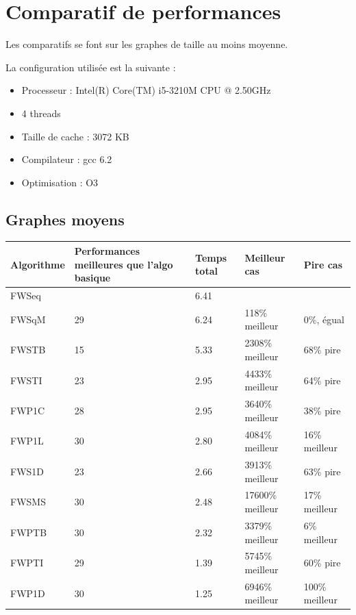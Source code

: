 \documentclass[a4paper,11pt]{article}
\begin{document}
\section{Comparatif de performances}

Les comparatifs se font sur les graphes de taille au moins moyenne.

La configuration utilisée est la suivante :

\begin{itemize}
  \item Processeur : Intel(R) Core(TM) i5-3210M CPU @ 2.50GHz
  \item 4 threads
  \item Taille de cache : 3072 KB
  \item Compilateur : gcc 6.2
  \item Optimisation : O3
\end{itemize}

\subsection{Graphes moyens}

\begin{center}
  \begin{tabular}{p{2cm} | p{4.5cm} | p{2cm} | p{3cm} | p{3cm}}
    \centering \textbf{Algorithme} & \centering \textbf {Performances meilleures que l'algo basique} & \centering \textbf{Temps total} & \centering \textbf{Meilleur cas} & \centering \textbf{Pire cas} \tabularnewline
    \hline
    FWSeq & & 6.41 & & \\
    \hline
    \hline
    FWSqM & 29 & 6.24 & 118\% meilleur & 0\%, égual \\
    \hline
    FWSTB & 15 & 5.33 & 2308\% meilleur & 68\% pire \\
    \hline
    FWSTI & 23 & 2.95 & 4433\% meilleur & 64\% pire \\
    \hline
    FWP1C & 28 & 2.95 & 3640\% meilleur & 38\% pire \\
    \hline
    FWP1L & 30 & 2.80 & 4084\% meilleur & 16\% meilleur \\
    \hline
    FWS1D & 23 & 2.66 & 3913\% meilleur & 63\% pire \\
    \hline
    FWSMS & 30 & 2.48 & 17600\% meilleur & 17\% meilleur \\
    \hline
    FWPTB & 30 & 2.32 & 3379\% meilleur & 6\% meilleur \\
    \hline
    FWPTI & 29 & 1.39 & 5745\% meilleur & 60\% pire \\
    \hline
    FWP1D & 30 & 1.25 & 6946\% meilleur & 100\% meilleur \\
    \hline
  \end{tabular}
\end{center}
\end{document}
